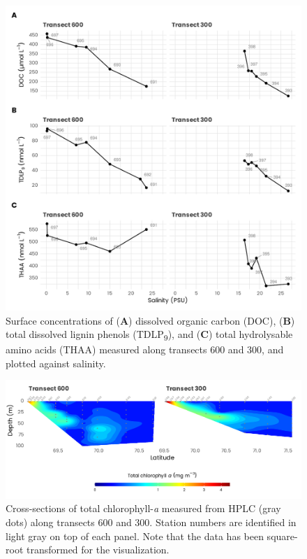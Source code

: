 \documentclass[essd, manuscript]{copernicus}
\begin{document}
\begin{figure}[H]
    \centering
    \includegraphics[scale = 1]{../../../graphs/fig09.pdf}
    \caption{Surface concentrations of (\textbf{A}) dissolved organic carbon (DOC), (\textbf{B}) total dissolved lignin phenols (TDLP\textsubscript{9}), and (\textbf{C}) total hydrolysable amino acids (THAA) measured along transects 600 and 300, and plotted against salinity.}
\end{figure}

\clearpage

\begin{figure}[H]
    \centering
    \includegraphics[scale = 1]{../../../graphs/fig10.pdf}
    \caption{Cross-sections of total chlorophyll-\textit{a} measured from HPLC (gray dots) along transects 600 and 300. Station numbers are identified in light gray on top of each panel. Note that the data has been square-root transformed for the visualization.}
\end{figure}
\end{document}
